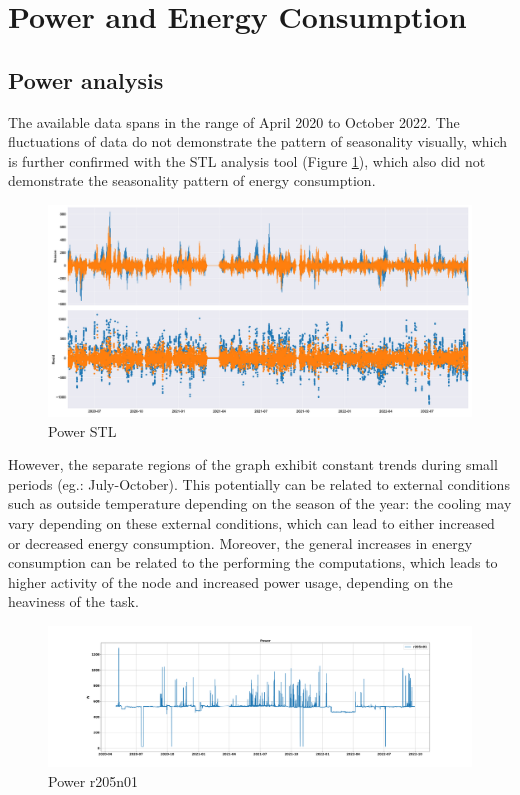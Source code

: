 \section{Power and Energy Consumption}
\noindent

\subsection{Power analysis}
The available data spans in the range of April 2020 to October 2022. 
The fluctuations of data do not demonstrate the pattern of seasonality visually, which is further confirmed with the STL analysis tool (Figure \ref{fig:PWR_STL}), which also did not demonstrate the seasonality pattern of energy consumption.

\begin{figure}[H]
    \centering
    \includegraphics[width=1\textwidth]{Figures/PWR_STL.png}
    \caption{Power STL}
    \label{fig:PWR_STL}
\end{figure}

However, the separate regions of the graph exhibit constant trends during small periods (eg.: July-October).
This potentially can be related to external conditions such as outside temperature depending on the season of the year: the cooling may vary depending on these external conditions, which can lead to either increased or decreased energy consumption.
Moreover, the general increases in energy consumption can be related to the performing the computations, which leads to higher activity of the node and increased power usage, depending on the heaviness of the task.

\begin{figure}[H]
    \centering
    \includegraphics[width=1\textwidth]{Figures/PWR_r205n01.png}
    \caption{Power r205n01}
    \label{fig:PWR_r205n01}
\end{figure}

